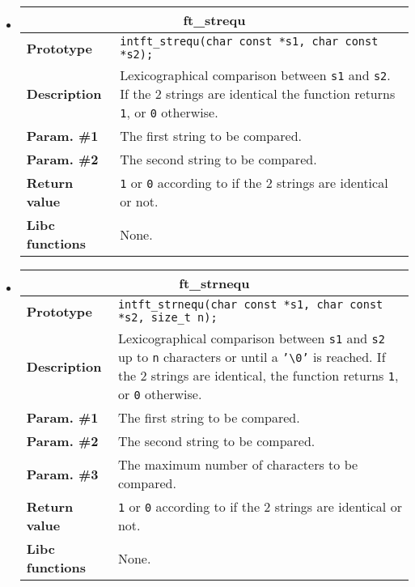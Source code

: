\documentclass{42-en}
\begin{document}
\begin{itemize}
            \item \begin{tabular}{|l|p{11cm}|}
                \hline
                \multicolumn{2}{|c|}{\textbf{ft\_strequ}}\\
                \hline
                \textbf{Prototype} &
                \texttt{int\hspace{5mm}ft\_strequ(char const *s1, char
                  const *s2);}\\
                \hline
                \textbf{Description} & Lexicographical comparison between
                \texttt{s1} and \texttt{s2}. If the 2 strings are identical
                the function returns \texttt{1}, or \texttt{0} otherwise.\\
                \hline
                \textbf{Param. \#1} & The first string to be compared.\\
                \hline
                \textbf{Param. \#2} & The second string to be compared.\\
                \hline
                \textbf{Return value} & \texttt{1} or \texttt{0} according to
                if the 2 strings are identical or not.\\
                \hline
                \textbf{Libc functions} & None.\\
                \hline
            \end{tabular}

            \item \begin{tabular}{|l|p{11cm}|}
                \hline
                \multicolumn{2}{|c|}{\textbf{ft\_strnequ}}\\
                \hline
                \textbf{Prototype} &
                \texttt{int\hspace{5mm}ft\_strnequ(char const *s1, char
                  const *s2, size\_t n);}\\
                \hline
                \textbf{Description} & Lexicographical comparison between
                \texttt{s1} and \texttt{s2} up to \texttt{n} characters
                or until a \texttt{'\textbackslash{}0'} is reached. If the 2 strings
                are identical, the function returns \texttt{1}, or \texttt{0} otherwise.\\
                \hline
                \textbf{Param. \#1} & The first string to be compared.\\
                \hline
                \textbf{Param. \#2} &The second string to be compared.\\
                \hline
                \textbf{Param. \#3} & The maximum number of characters
                to be compared.\\
                \hline
                \textbf{Return value} & \texttt{1} or \texttt{0} according to
                if the 2 strings are identical or not.\\
                \hline
                \textbf{Libc functions} & None.\\
                \hline
            \end{tabular}


\end{itemize}
\end{document}
